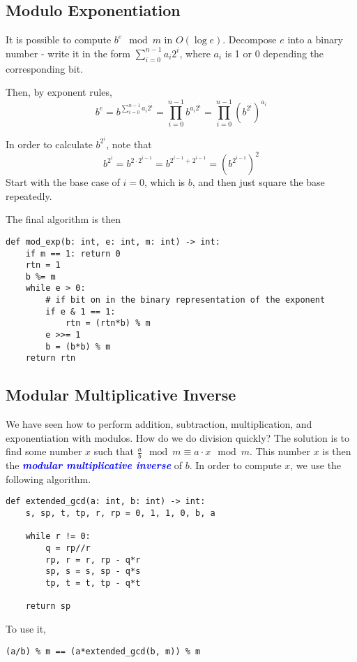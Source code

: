 \documentclass[11pt, oneside]{article}
\newcommand{\emphasis}[1]{\textcolor{blue}{\textbf{\textit{#1}}}}
\begin{document}
\subsection{Modulo Exponentiation}
It is possible to compute \( b^e \mod m \) in \( O(\log e) \). Decompose \( e \)
into a binary number - write it in the form \( \sum^{n - 1}_{i = 0} a_i 2^i \),
where \( a_i \) is 1 or 0 depending the corresponding bit.

Then, by exponent rules,
\[ b^e = b^{\sum^{n - 1}_{i = 0} a_i 2^i} = \prod^{n - 1}_{i = 0} b^{a_i 2^i} = \prod^{n - 1}_{i = 0} (b^{2^i})^{a_i} \]

In order to calculate \( b^{2^i} \), note that
\[ b^{2^i} = b^{2 \cdot 2^{i - 1}} = b^{2^{i - 1} + 2^{i - 1}} = (b^{2^{i - 1}})^2 \]
\noindent
Start with the base case of \( i = 0 \), which is \( b \), and then just square the base repeatedly.

The final algorithm is then
\begin{verbatim}
def mod_exp(b: int, e: int, m: int) -> int:
    if m == 1: return 0
    rtn = 1
    b %= m
    while e > 0:
        # if bit on in the binary representation of the exponent
        if e & 1 == 1:
            rtn = (rtn*b) % m
        e >>= 1
        b = (b*b) % m
    return rtn
\end{verbatim}

\subsection{Modular Multiplicative Inverse}
We have seen how to perform addition, subtraction, multiplication, and exponentiation with modulos.
How do we do division quickly?
The solution is to find some number \( x \) such that \( \frac{a}{b} \mod m \equiv a \cdot x \mod m \).
This number \( x \) is then the \emphasis{modular multiplicative inverse} of \( b \).
In order to compute \( x \), we use the following algorithm.

\begin{verbatim}
def extended_gcd(a: int, b: int) -> int:
    s, sp, t, tp, r, rp = 0, 1, 1, 0, b, a

    while r != 0:
        q = rp//r
        rp, r = r, rp - q*r
        sp, s = s, sp - q*s
        tp, t = t, tp - q*t

    return sp
\end{verbatim}

To use it,
\begin{verbatim}
(a/b) % m == (a*extended_gcd(b, m)) % m
\end{verbatim}
\end{document}
